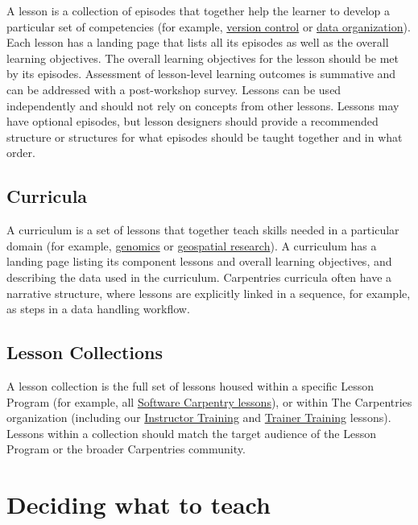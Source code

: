 \documentclass[
]{book}
\begin{document}
A lesson is a collection of episodes that together help the learner to develop a particular
set of competencies
(for example, \href{http://swcarpentry.github.io/git-novice/}{version control} or
\href{http://www.datacarpentry.org/spreadsheets-socialsci/}{data organization}).
Each lesson has a landing page that lists all its episodes as well
as the overall learning objectives. The overall learning objectives for the lesson
should be met by its episodes. Assessment of lesson-level learning outcomes is summative and
can be addressed with a post-workshop survey. Lessons can be used independently and should
not rely on concepts from other lessons. Lessons may have optional episodes, but lesson
designers should provide a recommended structure or structures for what episodes should
be taught together and in what order.

\hypertarget{curricula}{%
\section{Curricula}\label{curricula}}

A curriculum is a set of lessons that together teach skills needed in a particular
domain (for example, \href{https://datacarpentry.org/genomics-workshop/}{genomics} or
\href{https://datacarpentry.org/geospatial-workshop/}{geospatial research}). A curriculum has a
landing page listing its component lessons and overall learning objectives, and describing
the data used in the curriculum. Carpentries curricula often have a narrative structure,
where lessons are explicitly linked in a sequence, for example, as steps in a data handling
workflow.

\hypertarget{lesson-collections}{%
\section{Lesson Collections}\label{lesson-collections}}

A lesson collection is the full set of lessons housed within
a specific Lesson Program (for example, all \href{https://software-carpentry.org/lessons/}{Software Carpentry lessons}), or
within The Carpentries organization (including our \href{https://carpentries.github.io/instructor-training/}{Instructor Training} and
\href{https://carpentries.github.io/trainer-training/}{Trainer Training} lessons).
Lessons within a collection should match the target audience of the Lesson Program or
the broader Carpentries community.

\hypertarget{deciding-what-to-teach}{%
\chapter{Deciding what to teach}\label{deciding-what-to-teach}}
\end{document}
